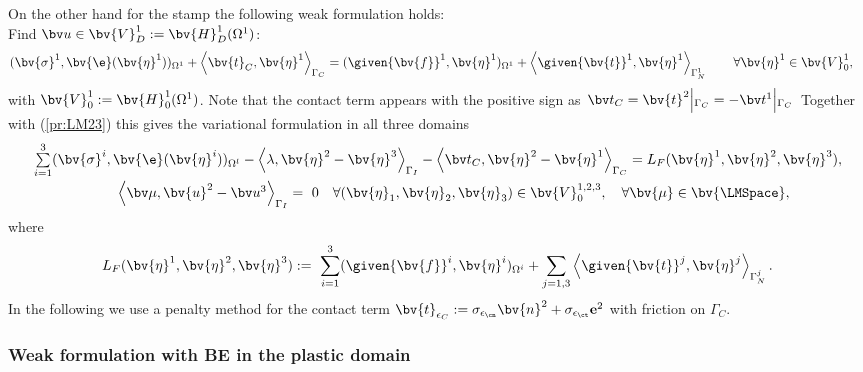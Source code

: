 On the other hand for the stamp the following weak formulation holds:\\
 Find $\bv u \in \bv{V}^1_D := \bv{H}^1_D(\Omega^1)$:
\begin{align*}
(\bv{\sigma}^1,\bv{\e}(\bv{\eta}^1))_{\Omega^1}
+ \left\langle \bv{t}_C, \bv{\eta}^1 \right\rangle_{\Gamma_C} 
&= (\given{\bv{f}}^{1}, \bv{\eta}^1)_{\Omega^1}
+ \left\langle \given{\bv{t}}^1, \bv{\eta}^1 \right\rangle_{\Gamma_N^1}
\qquad \forall \bv{\eta}^1 \in \bv{V}^1_0,
\end{align*}
with $\bv{V}^1_0 := \bv{H}^1_0(\Omega^1)$. Note that the contact term appears with the positive sign as $\left.\bv t_C = \bv{t}^{2}\middle|_{\Gamma_C} = - \bv t^{1}\middle|_{\Gamma_C}\right.$ Together with (\ref{pr:LM23}) this gives the variational formulation in all three domains
\begin{equation}\label{pr:LM:FEM}
\begin{array}{l}
\sum \limits_{i=1}^3 
   (\bv{\sigma}^i,\bv{\e}(\bv{\eta}^i))_{\Omega^l}
 - \left\langle \lambda, \bv{\eta}^2 - \bv{\eta}^3 \right\rangle_{\Gamma_I} 
 - \left\langle \bv t_C, \bv{\eta}^2 - \bv{\eta}^1 \right\rangle_{\Gamma_C} 
= L_F(\bv{\eta}^1, \bv{\eta}^2, \bv{\eta}^3),  \\[2ex]
\qquad \qquad \qquad \left\langle \bv \mu, \bv{u}^2 - \bv u^3 \right\rangle_{\Gamma_I} 
 =\,\, 0   \quad 
 \forall (\bv{\eta}_1,\bv{\eta}_2,\bv{\eta}_3) \in \bv{V}^{1,2,3}_0, \quad \forall \bv{\mu} \in \bv{\LMSpace}, 
\end{array}
\end{equation}
where
\begin{equation}\nonumber
L_F(\bv{\eta}^1, \bv{\eta}^2, \bv{\eta}^3):=\,\, \sum_{i=1}^3 
 (\given{\bv{f}}^i, \bv{\eta}^i)_{\Omega^i} 
+ \sum_{j=1,3}  \left\langle \given{\bv{t}}^j, \bv{\eta}^j \right\rangle_{\Gamma_N^j}.
\end{equation}
In the following we use a penalty method for the contact term $\bv{t}_{\epsilon_C} := \sigma_{\epsilon_\cn} \bv{n}^{2}+\sigma_{\epsilon_\ct} \mathbf{e}^{2}$ with friction on $\Gamma_C$.

\subsubsection{Weak formulation with BE in the plastic domain}

